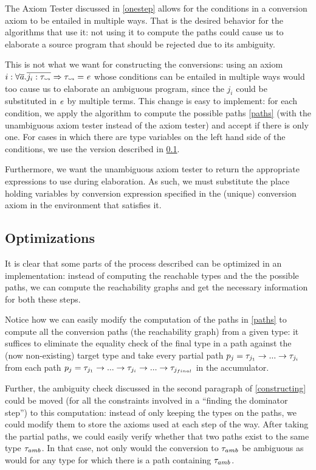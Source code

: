 The Axiom Tester discussed in \ref{onestep} allows for the conditions in a conversion axiom to be entailed in multiple ways. That is the desired behavior for the algorithms that use it:  not using it to compute the paths could cause us to elaborate a source program that should be rejected due to its ambiguity.

This is not what we want for constructing the conversions: using an axiom $i :\forall \overline{a} . \overline{j_i : \mathit{\tau_{\rightsquigarrow}}} \Rightarrow \mathit{\tau_{\rightsquigarrow}} = \mathit{e}$ whose conditions can be entailed in multiple ways would too cause us to elaborate an ambiguous program, since the $j_i$ could be substituted in $\mathit{e}$ by multiple terms. This change is easy to implement: for each condition, we apply the algorithm to compute the possible paths \ref{paths} (with the unambiguous axiom tester instead of the axiom tester) and accept if there is only one. For cases in which there are type variables on the left hand side of the conditions, we use the version described in \ref{opt}.

Furthermore, we want the unambiguous axiom tester to return the appropriate expressions to use during elaboration. As such, we must substitute the place holding variables by conversion expression specified in the (unique) conversion axiom in the environment that satisfies it.

\subsection{Optimizations}
\label{opt}

It is clear that some parts of the process described can be optimized in an implementation: instead of computing the reachable types and the the possible paths, we can compute the reachability graphs and get the necessary information for both these steps.

Notice how we can easily modify the computation of the paths in \ref{paths} to compute all the conversion paths (the reachability graph) from a given type: it suffices to eliminate the equality check of the final type in a path against the (now non-existing) target type and take every partial path $p_j = \mathit{\tau}_{j_1}\to ... \to \mathit{\tau}_{j_i}$ from each path $p_j = \mathit{\tau}_{j_1}\to ... \to \mathit{\tau}_{j_i} \to ... \to \mathit{\tau}_{j_{final}}$ in the accumulator.

Further, the ambiguity check discussed in the second paragraph of \ref{constructing} could be moved (for all the constraints involved in a ``finding the dominator step'') to this computation: instead of only keeping the types on the paths, we could modify them to store the axioms used at each step of the way. After taking the partial paths, we could easily verify whether that two paths exist to the same type $\mathit{\tau}_{amb}$. In that case, not only would the conversion to $\mathit{\tau}_{amb}$ be ambiguous as would for any type for which there is a path containing $\mathit{\tau}_{amb}$.

